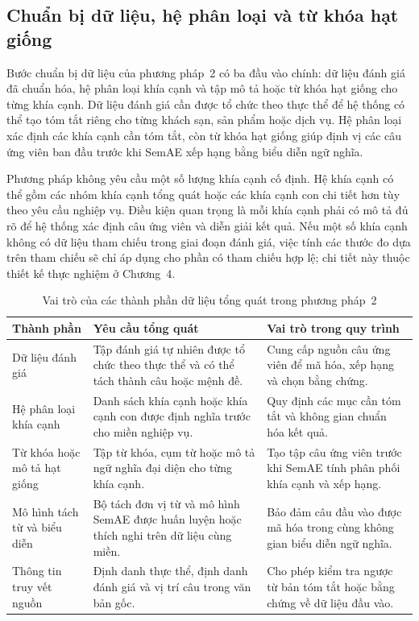 \subsection{Chuẩn bị dữ liệu, hệ phân loại và từ khóa hạt giống}
\label{subsec:method2-data-taxonomy-seeds}

Bước chuẩn bị dữ liệu của phương pháp~2 có ba đầu vào chính: dữ liệu đánh giá đã chuẩn hóa, hệ phân loại khía cạnh và tập mô tả hoặc từ khóa hạt giống cho từng khía cạnh. Dữ liệu đánh giá cần được tổ chức theo thực thể để hệ thống có thể tạo tóm tắt riêng cho từng khách sạn, sản phẩm hoặc dịch vụ. Hệ phân loại xác định các khía cạnh cần tóm tắt, còn từ khóa hạt giống giúp định vị các câu ứng viên ban đầu trước khi SemAE xếp hạng bằng biểu diễn ngữ nghĩa.

Phương pháp không yêu cầu một số lượng khía cạnh cố định. Hệ khía cạnh có thể gồm các nhóm khía cạnh tổng quát hoặc các khía cạnh con chi tiết hơn tùy theo yêu cầu nghiệp vụ. Điều kiện quan trọng là mỗi khía cạnh phải có mô tả đủ rõ để hệ thống xác định câu ứng viên và diễn giải kết quả. Nếu một số khía cạnh không có dữ liệu tham chiếu trong giai đoạn đánh giá, việc tính các thước đo dựa trên tham chiếu sẽ chỉ áp dụng cho phần có tham chiếu hợp lệ; chi tiết này thuộc thiết kế thực nghiệm ở Chương~4.

\begin{table}[tbp]
\centering
\caption{Vai trò của các thành phần dữ liệu tổng quát trong phương pháp~2}
\label{tab:method2-data-files}
\footnotesize
\setlength{\tabcolsep}{4pt}
\renewcommand{\arraystretch}{1.25}
\begin{tabularx}{\textwidth}{L{0.25\textwidth} Y Y}
\toprule
\textbf{Thành phần} & \textbf{Yêu cầu tổng quát} & \textbf{Vai trò trong quy trình} \\
\midrule
Dữ liệu đánh giá & Tập đánh giá tự nhiên được tổ chức theo thực thể và có thể tách thành câu hoặc mệnh đề. & Cung cấp nguồn câu ứng viên để mã hóa, xếp hạng và chọn bằng chứng. \\
Hệ phân loại khía cạnh & Danh sách khía cạnh hoặc khía cạnh con được định nghĩa trước cho miền nghiệp vụ. & Quy định các mục cần tóm tắt và không gian chuẩn hóa kết quả. \\
Từ khóa hoặc mô tả hạt giống & Tập từ khóa, cụm từ hoặc mô tả ngữ nghĩa đại diện cho từng khía cạnh. & Tạo tập câu ứng viên trước khi SemAE tính phân phối khía cạnh và xếp hạng. \\
Mô hình tách từ và biểu diễn & Bộ tách đơn vị từ và mô hình SemAE được huấn luyện hoặc thích nghi trên dữ liệu cùng miền. & Bảo đảm câu đầu vào được mã hóa trong cùng không gian biểu diễn ngữ nghĩa. \\
Thông tin truy vết nguồn & Định danh thực thể, định danh đánh giá và vị trí câu trong văn bản gốc. & Cho phép kiểm tra ngược từ bản tóm tắt hoặc bằng chứng về dữ liệu đầu vào. \\
\bottomrule
\end{tabularx}
\end{table}

